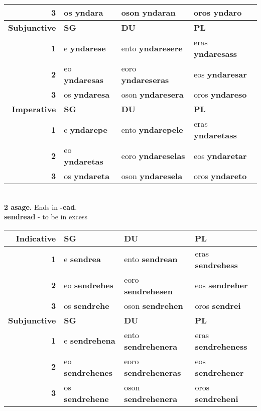 \begin{center}
\begin{tabular}{|r|l|l|l|}
    \textbf{3} & os \textbf{yndara} & oson \textbf{yndaran} & oros \textbf{yndaro} \\ \hline
    \textbf{Subjunctive} & \textbf{SG} & \textbf{DU} & \textbf{PL} \\ \hline
    \textbf{1} & e \textbf{yndarese} & ento \textbf{yndaresere} & eras \textbf{yndaresass} \\ \hline
    \textbf{2} & eo \textbf{yndaresas} & eoro \textbf{yndareseras} & eos \textbf{yndaresar} \\ \hline
    \textbf{3} & os \textbf{yndaresa} & oson \textbf{yndaresera} & oros \textbf{yndareso} \\ \hline
    \textbf{Imperative} & \textbf{SG} & \textbf{DU} & \textbf{PL} \\ \hline
    \textbf{1} & e \textbf{yndarepe} & ento \textbf{yndarepele} & eras \textbf{yndaretass} \\ \hline
    \textbf{2} & eo \textbf{yndaretas} & eoro \textbf{yndareselas} & eos \textbf{yndaretar} \\ \hline
    \textbf{3} & os \textbf{yndareta} & oson \textbf{yndaresela} & oros \textbf{yndareto} \\ \hline
  \end{tabular} \\
  \pagebreak
  \textbf{2 asage.} Ends in \textbf{-ead}. \\
  \textbf{sendread} - to be in excess \\
  \begin{tabular}{|r|l|l|l|}
    \hline
    \textbf{Indicative} & \textbf{SG} & \textbf{DU} & \textbf{PL} \\ \hline
    \textbf{1} & e \textbf{sendrea} & ento \textbf{sendrean} & eras \textbf{sendrehess} \\ \hline
    \textbf{2} & eo \textbf{sendrehes} & eoro \textbf{sendrehesen} & eos \textbf{sendreher} \\ \hline
    \textbf{3} & os \textbf{sendrehe} & oson \textbf{sendrehen} & oros \textbf{sendrei} \\ \hline
    \textbf{Subjunctive} & \textbf{SG} & \textbf{DU} & \textbf{PL} \\ \hline
    \textbf{1} & e \textbf{sendrehena} & ento \textbf{sendrehenera} & eras \textbf{sendreheness} \\ \hline
    \textbf{2} & eo \textbf{sendrehenes} & eoro \textbf{sendreheneras} & eos \textbf{sendrehener} \\ \hline
    \textbf{3} & os \textbf{sendrehene} & oson \textbf{sendrehenera} & oros \textbf{sendreheni} \\ \hline

\end{tabular}
\end{center}
